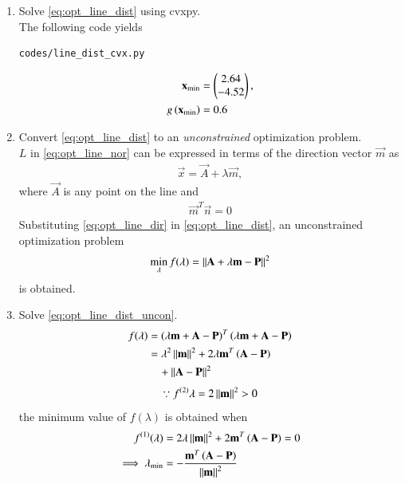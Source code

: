 \begin{enumerate}[label=\arabic*.,ref=\thesection.\theenumi]
\item Solve \eqref{eq:opt_line_dist} using cvxpy.
%
\\
\solution  The following code yields
%	
\begin{lstlisting}
codes/line_dist_cvx.py
\end{lstlisting}
%
\begin{align}
\mathbf{x}_{\min} &= \begin{pmatrix}2.64\\-4.52\end{pmatrix},
\\
g\left(\mathbf{x}_{\min}\right) &= 0.6
\end{align}
%

\item Convert  \eqref{eq:opt_line_dist} to an {\em unconstrained} optimization problem.
%
\\
%
\solution $L$ in \eqref{eq:opt_line_nor} can be expressed in terms of the direction vector $\vec{m}$ as
\begin{align}
\label{eq:opt_line_dir}
\vec{x} = \vec{A} + \lambda \vec{m}, 
\end{align}
where $\vec{A}$ is any point on the line and 
%
\begin{align}
\label{eq:opt_line_orth}
\vec{m}^T\vec{n} = 0
\end{align}
%
Substituting \eqref{eq:opt_line_dir} in \eqref{eq:opt_line_dist}, an unconstrained optimization problem 
\begin{align}
\label{eq:opt_line_dist_uncon}
\min_{\lambda}f(\lambda) = \left\lVert\mathbf{A} + \lambda \mathbf{m}-\mathbf{P}\right\rVert^2 
\end{align}
%
is obtained.
%
\item Solve \eqref{eq:opt_line_dist_uncon}.
%
\\
\solution 
\begin{align}
f(\lambda) 
& = \left( \lambda \mathbf{m}+\mathbf{A} -\mathbf{P}\right)^T \left( \lambda \mathbf{m}+\mathbf{A} -\mathbf{P}\right)
\\
&= \lambda^2 \left\lVert\mathbf{m}\right\rVert^2 +2\lambda \mathbf{m}^T\left(\mathbf{A} -\mathbf{P}\right) 
\nonumber \\
&\quad + \left\lVert\mathbf{A} -\mathbf{P}\right\rVert^2
\label{eq:opt_line_dist_uncon_dist}
\end{align}
\begin{align}
\because f^{(2)}\lambda = 2\left\lVert\mathbf{m}\right\rVert^2 > 0
\end{align}
%
the minimum value of $f(\lambda)$ is obtained when 
%
\begin{align}
 f^{(1)}(\lambda) &= 2\lambda\norm{\vec{m}}^2 + 2 \vec{m}^T\brak{\vec{A} -\vec{P}} =0
\\
\implies \lambda_{\min} &= -\frac{\vec{m}^T\brak{\vec{A} -\vec{P}}}{\norm{\vec{m}}^2}

\end{align}
\end{enumerate}
